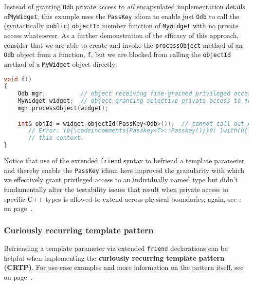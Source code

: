 \noindent Instead of granting \texttt{Odb} private access to \emph{all}
encapsulated implementation details of\linebreak[4] \mbox{\texttt{MyWidget}}, this example
uses the \texttt{PassKey} idiom to enable just \texttt{Odb} to call the
(syntactically \texttt{public}) \texttt{objectId} member function of
\texttt{MyWidget} with no private access whatsoever. As a further
demonstration of the efficacy of this approach, consider that we are
able to create and invoke the \texttt{processObject} method of an
\texttt{Odb} object from a function, \texttt{f}, but we are blocked from
calling the \texttt{objectId} method of a \texttt{MyWidget} object
directly:

\begin{lstlisting}[language=C++]
void f()
{
    Odb mgr;          // object receiving fine-grained privileged access
    MyWidget widget;  // object granting selective private access to just (ù{\codeincomments{Odb}}ù)
    mgr.processObject(widget);

    int& objId = widget.objectId(PassKey<Odb>());  // cannot call out of (ù{\codeincomments{Odb}}ù)
       // Error: (ù{\codeincomments{Passkey<T>::Passkey()}}ù) [with(ù{\codeincomments{T}}ù) = (ù{\codeincomments{Odb}}ù)] is private within
       // this context.
}
\end{lstlisting}
    
\noindent Notice that use of the extended \texttt{friend} syntax to befriend a
template parameter and thereby enable the \texttt{PassKey} idiom here
improved the granularity with which we effectively grant privileged
access to an individually named type but didn't fundamentally alter the
testability issues that result when private access to specific C++
types is allowed to extend across physical boundaries; again, see
\textit{: } on page~\pageref{long-distance-friendship}.

\subsubsection[Curiously recurring template pattern]{Curiously recurring template pattern}\label{curiously-recurring-template-pattern}

Befriending a template parameter via extended \texttt{friend}
declarations can be helpful when implementing the \textbf{curiously
recurring template pattern (CRTP)}. For use-case examples and more
information on the pattern itself, see \textit{} on page~\pageref{appendix:-crtp-use-cases}.

